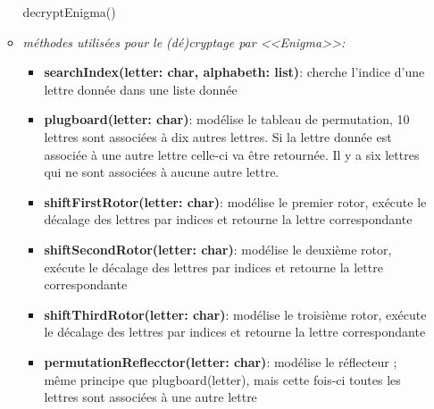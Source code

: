 \documentclass[a4paper,12pt,abstracton,titlepage]{scrartcl}
\begin{document}
\begin{itemize}
\begin{itemize}
decryptEnigma()
\vspace{0.5cm}
\item \textit{méthodes utilisées pour le (dé)cryptage par <<Enigma>>:}
\vspace{0.3cm}
\begin{itemize}
\item \textbf{searchIndex(letter: char, alphabeth: list)}:
cherche l'indice d'une lettre donnée dans une liste donnée\\
\item \textbf{plugboard(letter: char)}:
modélise le tableau de permutation, 10 lettres sont associées à dix autres lettres. Si la lettre donnée est associée à une autre lettre celle-ci va être retournée. Il y a six lettres qui ne sont associées à aucune autre lettre.\\
\item \textbf{shiftFirstRotor(letter: char)}:
modélise le premier rotor, exécute le décalage des lettres par indices et retourne la lettre correspondante\\
\item \textbf{shiftSecondRotor(letter: char)}:
modélise le deuxième rotor, exécute le décalage des lettres par indices et retourne la lettre correspondante\\
\item \textbf{shiftThirdRotor(letter: char)}:
modélise le troisième rotor, exécute le décalage des lettres par indices et retourne la lettre correspondante\\
\item \textbf{permutationReflecctor(letter: char)}:
modélise le réflecteur ; même principe que plugboard(letter), mais cette fois-ci toutes les lettres sont associées à une autre lettre\\
 \end{itemize}
 \end{itemize}
\vspace{0.4cm}


\end{itemize}
\end{document}
